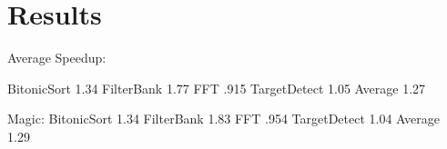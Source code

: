 \section{Results}

Average Speedup:

BitonicSort     1.34
FilterBank      1.77
FFT             .915
TargetDetect    1.05
Average         1.27

Magic:
BitonicSort     1.34
FilterBank      1.83
FFT             .954
TargetDetect    1.04
Average         1.29

